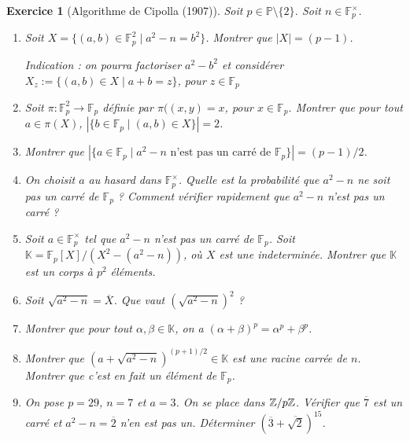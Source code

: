 \documentclass[11pt,a4paper]{article}
\newtheorem{ex}{Exercice}
\newcommand{\F}{\mathbb{F}}
\begin{document}
\begin{ex}[Algorithme de Cipolla (1907)]
Soit $p\in \mathbb{P}\setminus\{2\}$. Soit $n\in \F_p^\times$.
\begin{enumerate}
\item Soit $X=\{(a,b)\in \F_p^2\mid a^2-n=b^2\}$. Montrer que $|X|=(p-1)$.

\textit{Indication : on pourra factoriser $a^2-b^2$ et considérer $X_z:=\{(a,b)\in X\mid a+b=z\}$, pour $z\in \F_p$}

\item Soit $\pi:\F_p^2\rightarrow \F_p$ définie par $\pi((x,y)=x$, pour $x\in \F_p$. Montrer que pour tout $a\in \pi(X)$, $|\{b\in \F_p\mid (a,b)\in X\}|=2$.


\item Montrer que $|\{a\in \F_p\mid a^2-n\text{ n'est pas un carré de }\F_p\}|=(p-1)/2$.


 

\item On choisit $a$ au hasard dans $\F_p^\times $. Quelle est la probabilité que $a^2-n$ ne soit pas un carré de $\F_p$ ? Comment vérifier rapidement que $a^2-n$ n'est pas un carré ?

\item Soit $a\in \F_p^\times$ tel que $a^2-n$ n'est pas un carré de $\F_p$.  Soit $\mathbb{K}=\F_p[X]/(X^2-(a^2-n))$, où $X$ est une indeterminée. Montrer que $\mathbb{K}$ est un corps à $p^2$ éléments.

\item Soit $\sqrt{a^2-n}=\overline{X}$. Que vaut $(\sqrt{a^2-n})^2$ ?

\item Montrer que pour tout $\alpha,\beta\in \mathbb{K}$, on a $(\alpha+\beta)^p=\alpha^p+\beta^p$.

\item Montrer que $(a+\sqrt{a^2-n})^{(p+1)/2}\in \mathbb{K}$ est une racine carrée de $n$. Montrer que c'est en fait un élément de $\F_p$.

\item On pose $p=29$, $n=7$ et $a=3$. On se place dans $\mathbb{Z}/p\mathbb{Z}$. Vérifier que $\overline{7}$ est un carré  et $a^2-n=\overline{2}$ n'en est pas un. Déterminer $(\overline{3}+\overline{\sqrt{2}})^{15}$.
\end{enumerate}

\end{ex}
\end{document}
